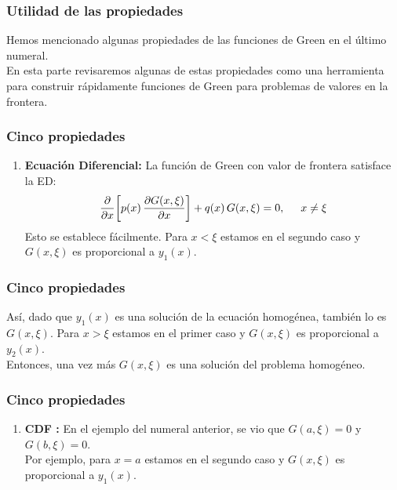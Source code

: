 \documentclass[12pt]{beamer}
\begin{document}
\begin{frame}
\frametitle{Utilidad de las propiedades}
Hemos mencionado algunas propiedades de las funciones de Green en el último numeral.
\\
\bigskip
\pause
En esta parte revisaremos algunas de estas propiedades como una herramienta para construir rápidamente funciones de Green para problemas de valores en la frontera.
\end{frame}
\begin{frame}
\frametitle{Cinco propiedades}
\begin{enumerate}[<+->]
\item \textbf{Ecuación Diferencial: } La función de Green con valor de frontera satisface la ED:
\pause
\begin{align*}
\pdv{x} \bigg[ p (x) \, \pdv{G (x, \xi)}{x} \bigg] + q (x) \, G (x, \xi) = 0, \hspace{0.5cm} x \neq \xi
\end{align*}
Esto se establece fácilmente. \pause Para $x < \xi$ estamos en el  segundo caso y $G (x, \xi)$ es proporcional a $y_{1} (x)$.
\seti
\end{enumerate}
\end{frame}
\begin{frame}
\frametitle{Cinco propiedades}
Así, dado que $y_{1} (x)$ es una solución de la ecuación homogénea, también lo es $G (x, \xi)$. Para $x > \xi$ estamos en el primer caso y $G (x, \xi)$ es proporcional a $y_{2} (x)$.
\\
\bigskip
\pause
Entonces, una vez más $G (x, \xi)$ es una solución del problema homogéneo.
\end{frame}
\begin{frame}
\frametitle{Cinco propiedades}
\begin{enumerate}[<+->]
\conti
\item \textbf{CDF :} En el ejemplo del numeral anterior, se vio que $G (a, \xi) = 0$ y $G (b, \xi) = 0$.
\\
\bigskip
\pause
Por ejemplo, para $x = a$ estamos en el segundo caso y $G (x, \xi)$ es proporcional a $y_{1} (x)$.
\seti
\end{enumerate}
\end{frame}
\end{document}
